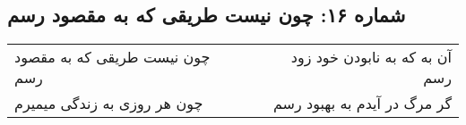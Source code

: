\begin{center}
\section*{شماره ۱۶: چون نیست طریقی که به مقصود رسم}
\label{sec:016}
\begin{longtable}{l p{0.5cm} r}
چون نیست طریقی که به مقصود رسم
&&
آن به که به نابودن خود زود رسم
\\
چون هر روزی به زندگی میمیرم
&&
گر مرگ در آیدم به بهبود رسم
\\
\end{longtable}
\end{center}
